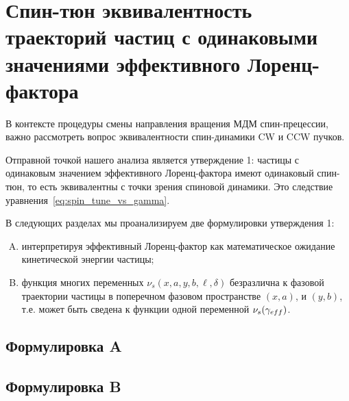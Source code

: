 

\section{Спин-тюн эквивалентность траекторий частиц с одинаковыми значениями эффективного Лоренц-фактора}\label{sec:spin_tune_traj_equivalence}
В контексте процедуры смены направления вращения МДМ спин-прецессии, важно рассмотреть 
вопрос эквивалентности спин-динамики CW и CCW пучков. 

Отправной точкой нашего анализа является утверждение 1: частицы с одинаковым значением эффективного Лоренц-фактора имеют одинаковый спин-тюн, то есть эквивалентны с точки зрения спиновой динамики. Это следствие уравнения~\eqref{eq:spin_tune_vs_gamma}.

В следующих разделах мы проанализируем две формулировки утверждения 1:
\begin{enumerate}[A.]
	\item интерпретируя эффективный Лоренц-фактор как математическое ожидание кинетической энергии частицы;
	\item функция многих переменных $\nu_s(x, a, y, b, \ell, \delta)$ безразлична к фазовой траектории частицы 
	в поперечном фазовом пространстве $(x,a)$, и $(y,b)$, т.е. может быть сведена 
	к функции одной переменной $\nu_s(\g*)$.
\end{enumerate}

\subsection{Формулировка A}


\subsection{Формулировка B}\label{sec:spin_stune_traj_equ:B_form}


\clearpage
